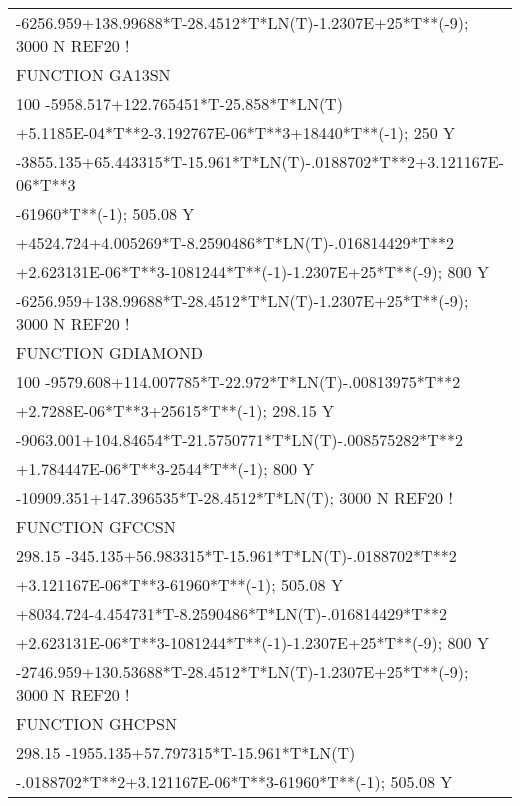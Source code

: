 \begin{longtable}[H]{ l l l }
	\multicolumn{3}{l}{-6256.959+138.99688*T-28.4512*T*LN(T)-1.2307E+25*T**(-9); 3000 N REF20 !}\\
	FUNCTION GA13SN & & \\
	\multicolumn{3}{l}{100 -5958.517+122.765451*T-25.858*T*LN(T)}\\
	\multicolumn{3}{l}{+5.1185E-04*T**2-3.192767E-06*T**3+18440*T**(-1); 250 Y}\\
	\multicolumn{3}{l}{-3855.135+65.443315*T-15.961*T*LN(T)-.0188702*T**2+3.121167E-06*T**3}\\
	\multicolumn{3}{l}{-61960*T**(-1); 505.08 Y}\\
	\multicolumn{3}{l}{+4524.724+4.005269*T-8.2590486*T*LN(T)-.016814429*T**2}\\
	\multicolumn{3}{l}{+2.623131E-06*T**3-1081244*T**(-1)-1.2307E+25*T**(-9); 800 Y}\\
	\multicolumn{3}{l}{-6256.959+138.99688*T-28.4512*T*LN(T)-1.2307E+25*T**(-9); 3000 N REF20 !}\\
	FUNCTION GDIAMOND & & \\
	\multicolumn{3}{l}{100 -9579.608+114.007785*T-22.972*T*LN(T)-.00813975*T**2}\\
	\multicolumn{3}{l}{+2.7288E-06*T**3+25615*T**(-1); 298.15 Y}\\
	\multicolumn{3}{l}{-9063.001+104.84654*T-21.5750771*T*LN(T)-.008575282*T**2}\\
	\multicolumn{3}{l}{+1.784447E-06*T**3-2544*T**(-1); 800 Y}\\
	\multicolumn{3}{l}{-10909.351+147.396535*T-28.4512*T*LN(T); 3000 N REF20 !}\\
	FUNCTION GFCCSN & & \\
	\multicolumn{3}{l}{298.15 -345.135+56.983315*T-15.961*T*LN(T)-.0188702*T**2}\\
	\multicolumn{3}{l}{+3.121167E-06*T**3-61960*T**(-1); 505.08 Y}\\
	\multicolumn{3}{l}{+8034.724-4.454731*T-8.2590486*T*LN(T)-.016814429*T**2}\\
	\multicolumn{3}{l}{+2.623131E-06*T**3-1081244*T**(-1)-1.2307E+25*T**(-9); 800 Y}\\
	\multicolumn{3}{l}{-2746.959+130.53688*T-28.4512*T*LN(T)-1.2307E+25*T**(-9); 3000 N REF20 !}\\
	FUNCTION GHCPSN & & \\
	\multicolumn{3}{l}{298.15 -1955.135+57.797315*T-15.961*T*LN(T)}\\
	\multicolumn{3}{l}{-.0188702*T**2+3.121167E-06*T**3-61960*T**(-1); 505.08 Y}\\

\end{longtable}
